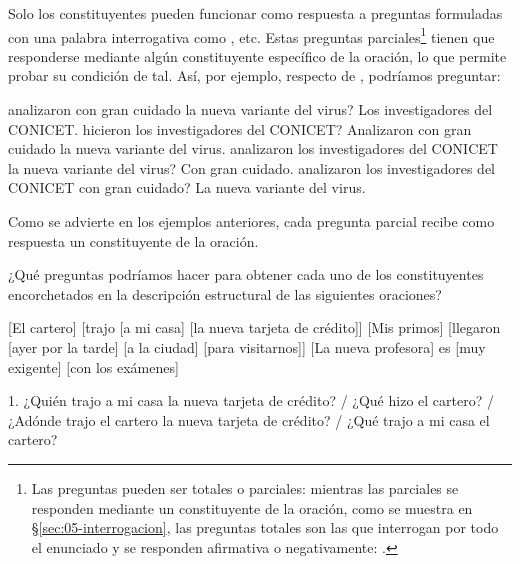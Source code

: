 Solo los constituyentes pueden funcionar como respuesta a preguntas formuladas
con una palabra interrogativa como , etc. Estas
preguntas parciales\footnote{Las preguntas pueden ser totales o parciales:
mientras las parciales se responden mediante un constituyente de la oración,
como se muestra en §\ref{sec:05-interrogacion}, las preguntas totales son las
que interrogan por todo el enunciado y se responden afirmativa o negativamente:
.} tienen que
responderse mediante algún constituyente específico de la oración, lo que
permite probar su condición de tal. Así, por ejemplo, respecto de
, podríamos preguntar:

\begin{exe}
  \ex\label{ex:05-preguntas}
    \begin{xlist}
      \ex {} analizaron con gran cuidado la nueva variante del
          virus? Los investigadores del CONICET.
      \ex {} hicieron los investigadores del CONICET? Analizaron con
          gran cuidado la nueva variante del virus.
      \ex {} analizaron los investigadores del CONICET la nueva
          variante del virus? Con gran cuidado.
      \ex {} analizaron los investigadores del CONICET con gran
          cuidado? La nueva variante del virus.
    \end{xlist}
\end{exe}

Como se advierte en los ejemplos anteriores, cada pregunta parcial recibe como
respuesta un constituyente de la oración.

\begin{ejercicio}\label{ej:05-preguntas}
¿Qué preguntas podríamos hacer para obtener cada uno de los constituyentes
encorchetados en la descripción estructural de las siguientes oraciones?

\begin{exe}
  \ex {}[El cartero] [trajo [a mi casa] [la nueva tarjeta de crédito]]
  \ex {}[Mis primos] [llegaron [ayer por la tarde] [a la ciudad] [para
      visitarnos]]
  \ex {}[La nueva profesora] es [muy exigente] [con los exámenes]
\end{exe}

\begin{resuelto}
1. ¿Quién trajo a mi casa la nueva tarjeta de crédito? / ¿Qué hizo el cartero? /
¿Adónde trajo el cartero la nueva tarjeta de crédito? / ¿Qué trajo a mi casa el
cartero?
\end{resuelto}
\end{ejercicio}

